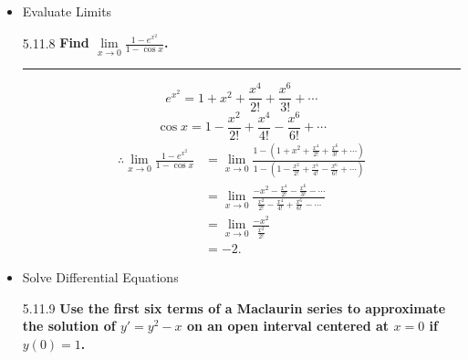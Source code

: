 \documentclass[12pt, a4paper]{article}
\begin{document}
\begin{enumerate}
\begin{itemize}
\begin{example}{5.11.6}{}
$$\begin{aligned}
                &=2\sum_{n=0}^\infty\frac{x^{2n+1}}{2n+1}.
            \end{aligned}$$
        \end{example}
        \begin{example}{5.11.7 Question}{}
            \textbf{Find the Maclaurin series of $f(x)=\frac{x}{(1+x)^2}$.}
        \end{example}            
        \begin{example}{5.11.7 Answer}{}
        $$\begin{aligned}
                f(x)&=x(1+x)^{-2}\\
                &=x\sum_{n=0}^\infty\binom{-2}{n}x^n\\
                &=\sum_{n=0}^\infty(-1)^n(n+1)x^{n+1}.
            \end{aligned}$$
        \end{example}
        \item Evaluate Limits
        \begin{example}{5.11.8}{}
            \textbf{Find $\lim\limits_{x\to 0}\frac{1-e^{x^2}}{1-\cos x}$.}\\
            \noindent\rule[0.1pt]{\textwidth}{1pt}
            $$e^{x^2}=1+x^2+\frac{x^4}{2!}+\frac{x^6}{3!}+\cdots$$
            $$\cos x=1-\frac{x^2}{2!}+\frac{x^4}{4!}-\frac{x^6}{6!}+\cdots$$
            $$\begin{aligned}
                \therefore \lim_{x\to 0}\frac{1-e^{x^2}}{1-\cos x}&=\lim_{x\to 0}\frac{1-\left(1+x^2+\frac{x^4}{2!}+\frac{x^6}{3!}+\cdots\right)}{1-\left(1-\frac{x^2}{2!}+\frac{x^4}{4!}-\frac{x^6}{6!}+\cdots\right)}\\
                &=\lim_{x\to 0}\frac{-x^2-\frac{x^4}{2!}-\frac{x^6}{3!}-\cdots}{\frac{x^2}{2!}-\frac{x^4}{4!}+\frac{x^6}{6!}-\cdots}\\
                &=\lim_{x\to 0}\frac{-x^2}{\frac{x^2}{2!}}\\
                &=-2.
            \end{aligned}$$
            {\color{green}{[Consider only the smallest power of $x$, as higher powers will go to zero much quicker.]}}
        \end{example}
        \item Solve Differential Equations
        \begin{example}{5.11.9}{}
            \textbf{Use the first six terms of a Maclaurin series to approximate the solution of $y'=y^2-x$ on an open interval centered at $x=0$ if $y(0)=1$.}\\

\end{example}
\end{itemize}
\end{enumerate}
\end{document}
